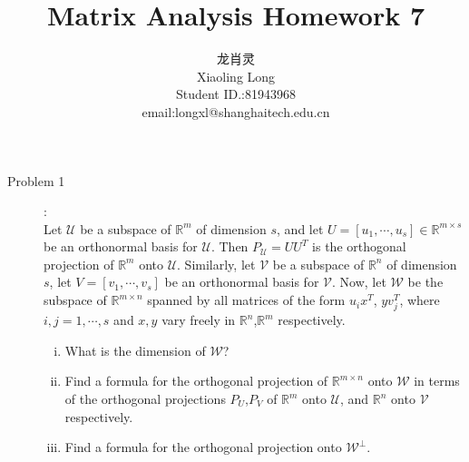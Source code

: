 \documentclass[a4paper]{article}
\title{Matrix Analysis Homework 7}
\author{龙肖灵 \\Xiaoling Long\\Student ID.:81943968\\email:longxl@shanghaitech.edu.cn}
\begin{document}
\maketitle

\begin{description}
  \item[Problem 1]:\\
  Let $\mathcal{U}$ be a subspace of $\mathbb{R}^{m}$ of dimension $s$, and let
$U=\left[u_{1},\cdots,u_{s}\right]\in \mathbb{R}^{m\times s}$ be an orthonormal basis for $\mathcal{U}$. Then $P_{\mathcal{U}}=UU^{T}$ is the orthogonal projection of $\mathbb{R}^{m}$ onto $\mathcal{U}$. Similarly, let $\mathcal{V}$ be a subspace of $\mathbb{R}^{n}$ of dimension $s$, let $V=\left[v_{1},\cdots,v_{s}\right]$ be an orthonormal basis for $\mathcal{V}$. Now, let $\mathcal{W}$ be the subspace of $\mathbb{R}^{m\times n}$ spanned by all matrices of the form $u_{i}x^{T}$, $yv_{j}^{T}$, where $i,j=1,\cdots,s $ and $x,y$ vary freely in $\mathbb{R}^{n}$,$\mathbb{R}^{m}$ respectively.
\begin{enumerate}[i)]
  \item What is the dimension of $\mathcal{W}$?
  \item Find a formula for the orthogonal projection of $\mathbb{R}^{m\times n}$ onto $\mathcal{W}$ in terms of the orthogonal projections $P_{U}$,$P_{V}$ of $\mathbb{R}^{m}$ onto $\mathcal{U}$, and $\mathbb{R}^{n}$ onto $\mathcal{V}$ respectively.
  \item Find a formula for the orthogonal projection onto $\mathcal{W}^{\perp}$.
\end{enumerate}


\end{description}
\end{document}
